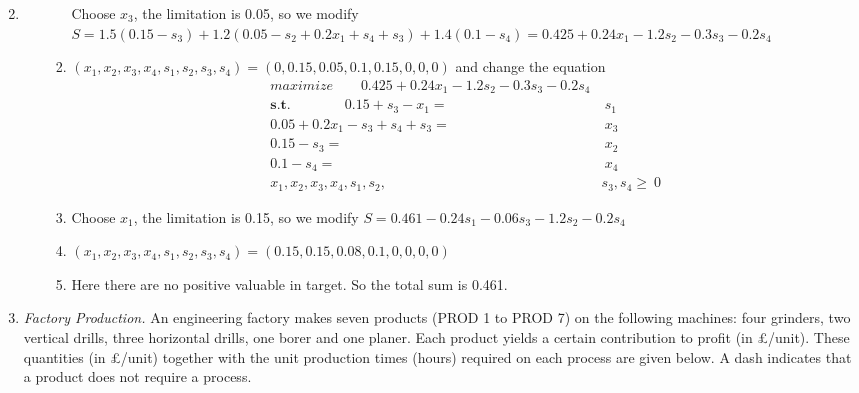 \documentclass[12pt,a4paper]{article}
\makeatletter
\newtheorem*{solution}{Solution}
\theoremstyle{definition}
\renewenvironment{solution}[1][Solution] {\par\pushQED{\qed}\normalfont\topsep6\p@\@plus6\p@\relax\trivlist\item[\hskip\labelsep\bfseries#1\@addpunct{.}]\ignorespaces}{\popQED\endtrivlist\@endpefalse} \makeatother
\makeatother
\begin{document}
\begin{enumerate}
\begin{solution}
\begin{enumerate}
\begin{enumerate}
                Choose $x_3$, the limitation is 0.05, so we modify $S=1.5(0.15-s_3)+1.2(0.05-s_2+0.2x_1+s_4+s_3)+1.4(0.1-s_4)=0.425+0.24x_1-1.2s_2-0.3s_3-0.2s_4$
                \item $(x_1,x_2,x_3,x_4,s_1,s_2,s_3,s_4)=(0,0.15,0.05,0.1,0.15,0,0,0)$ and change the equation 
            \begin{equation}
                \begin{aligned}
                maximize ~~~~~~~~~0.425+0.24x_1-1.2s_2-0.3s_3-0.2s_4\\
                \textbf{s.t. }~~~~~~~~~~~~~~~~0.15+s_3-x_1=&~s_1\\
               0.05+0.2x_1-s_3+s_4+s_3=&~x_3\\
               0.15-s_3=&~x_2\\
               0.1-s_4=&~x_4\\
               x_1,x_2,x_3,x_4,s_1,s_2,&s_3,s_4\ge~0
                \end{aligned}
            \end{equation}
            \item
                Choose $x_1$, the limitation is 0.15, so we modify $S=0.461-0.24s_1-0.06s_3-1.2s_2-0.2s_4$
                \item $(x_1,x_2,x_3,x_4,s_1,s_2,s_3,s_4)=(0.15,0.15,0.08,0.1,0,0,0,0)$
                \item Here there are no positive valuable in target. So the total sum is 0.461.
            \end{enumerate}
    \end{enumerate}    
    \end{solution}
    \item
    \textit{Factory Production.} An engineering factory makes seven products (PROD 1 to PROD 7) on the following machines: four grinders, two vertical drills, three horizontal drills, one borer and one planer. Each product yields a certain contribution to profit (in \pounds/unit). These quantities (in \pounds/unit) together with the unit production times (hours) required on each process are given below. A dash indicates that a product does not require a process.


\end{enumerate}
\end{document}
